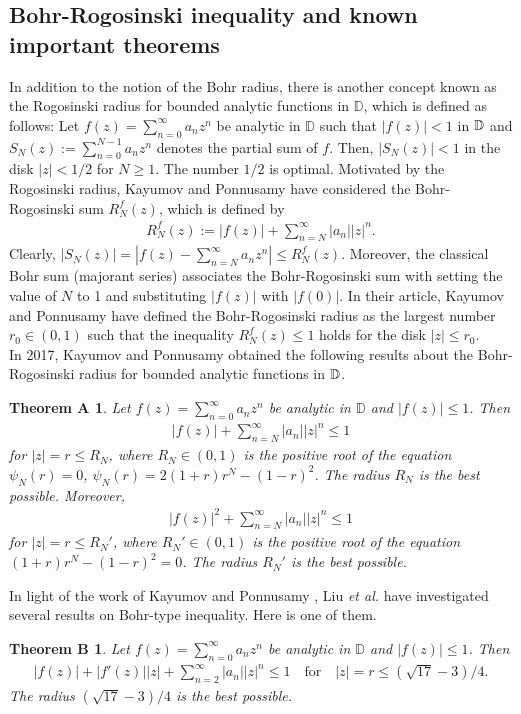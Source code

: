 \documentclass[11pt,reqno]{amsart}
\newtheorem*{theoA}{Theorem A}
\newtheorem*{theoB}{Theorem B}
\newtheorem{open problem}{Open problem}[section]
\newcommand{\D}{{\Bbb{D}}}
\newcommand{\beas}{\begin{eqnarray*}}
\newcommand{\eeas}{\end{eqnarray*}}
\numberwithin{equation}{section}
\begin{document}
\subsection{Bohr-Rogosinski inequality and known important theorems} 
In addition to the notion of the Bohr radius, there is another concept known as the Rogosinski radius \cite{R1923} for bounded analytic functions in $\mathbb{D}$, which is defined as follows: Let $f(z)=\sum_{n=0}^{\infty}a_nz^n$ be analytic in $\mathbb{D}$ such that $|f(z)|<1$ in $\Bbb{D}$ and $S_N(z):=\sum_{n=0}^{N-1}a_nz^n$ denotes the partial 
sum of $f$. Then, $\left|S_N(z)\right|<1$ in the disk $|z|<1/2$ for $N\geq 1$. The number $1/2$ is optimal. 
Motivated by the Rogosinski radius, Kayumov and Ponnusamy \cite{1KP2017} have considered the Bohr-Rogosinski sum $R_N^f(z)$, which is defined by
\beas R_N^f(z):=|f(z)|+\sum_{n=N}^{\infty}|a_n||z|^n.\eeas
Clearly, $|S_N(z)|=\left|f(z)-\sum_{n=N}^{\infty}a_nz^n\right|\leq R_N^f(z)$. 
Moreover, the classical Bohr sum (majorant series) associates the Bohr-Rogosinski sum with setting the value of $N$ to 1 and substituting $|f(z)|$ with $|f(0)|$.
In their article, Kayumov and Ponnusamy \cite{1KP2017} have defined the Bohr-Rogosinski radius as the largest number $r_0\in(0,1)$ such that the inequality $R_N^f(z)\le1$ holds for the disk $|z|\leq r_0$.\\[2mm] 
\indent
In 2017, Kayumov and Ponnusamy \cite{1KP2017} obtained the following results about the Bohr-Rogosinski radius for bounded analytic functions in $\D$.
\begin{theoA}\cite{1KP2017}
Let $f(z)=\sum_{n=0}^{\infty} a_nz^n$ be analytic in $\mathbb{D}$ and $|f(z)|\leq 1$. Then
\beas |f(z)|+\sum_{n=N}^{\infty}|a_n||z|^n\leq 1\eeas
for $|z|= r\leq R_N$, where $R_N\in(0,1)$ is the positive root of the equation $\psi_N( r)=0$, $\psi_N( r)=2(1+ r) r^N-(1- r)^2$. The radius $R_N$ is the best possible. Moreover, 
\beas|f(z)|^2+\sum_{n=N}^{\infty}|a_n||z|^n\leq 1\eeas
for $|z|= r\leq R_N'$, where $R_N'\in (0,1)$ is the positive root of the equation $(1+ r) r^N-(1- r)^2=0$. The radius $R_N'$ is the best possible.
\end{theoA}
In light of the work of Kayumov and Ponnusamy \cite{1KP2017}, Liu {\it et al.} \cite{LSX2018} have investigated several results on Bohr-type inequality. Here is one of them.
\begin{theoB}\cite{LSX2018}
Let $f(z)=\sum_{n=0}^{\infty} a_nz^n$ be analytic in $\mathbb{D}$ and $|f(z)|\leq 1$. Then
\beas |f(z)|+|f'(z)||z|+\sum_{n=2}^{\infty}|a_n||z|^n\leq 1\quad\text{for}\quad |z|=r\leq (\sqrt{17}-3)/4.\eeas
The radius $(\sqrt{17}-3)/4$ is the best possible.
\end{theoB}
\end{document}
